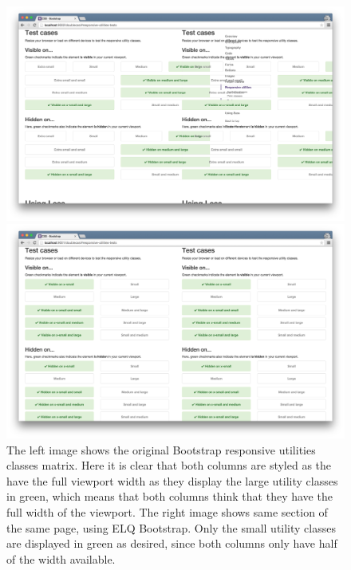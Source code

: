 \documentclass[a4paper,11pt]{kth-mag}
\begin{document}
      \begin{figure}[htb!]
        \centering
        \begin{minipage}{.5\textwidth}
          \centering
          \includegraphics[width=\linewidth]{images/bootstrap-mq-matrix}
        \end{minipage}%
        \begin{minipage}{.5\textwidth}
          \centering
          \includegraphics[width=\linewidth]{images/bootstrap-eq-matrix}
        \end{minipage}
        \caption{
          The left image shows the original Bootstrap responsive utilities classes matrix.
          Here it is clear that both columns are styled as the have the full viewport width as they display the large utility classes in green, which means that both columns think that they have the full width of the viewport.
          The right image shows same section of the same page, using \gls{ELQ} Bootstrap.
          Only the small utility classes are displayed in green as desired, since both columns only have half of the width available.
        }
        \label{fig:eval-bootstrap-mq-eq-matrix}
      \end{figure}
\end{document}
